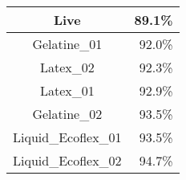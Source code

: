 \begin{tabular}{ c   r }
    Live               &  89.1\% \\ \hline\hline
    Gelatine\_01       &  92.0\% \\ 
    Latex\_02          &  92.3\% \\
    Latex\_01          &  92.9\% \\
    Gelatine\_02       &  93.5\% \\
    Liquid\_Ecoflex\_01 & 93.5\% \\
    Liquid\_Ecoflex\_02 & 94.7\%
\end{tabular}








